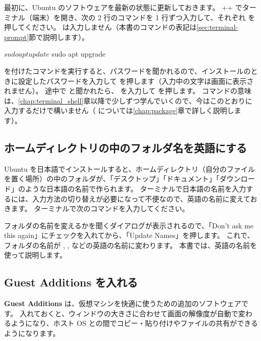 最初に、Ubuntu のソフトウェアを最新の状態に更新しておきます。
++ でターミナル（端末）を開き、次の 2 行のコマンドを 1 行ずつ入力して、それぞれ  を押してください。
\cmd{\$} は入力しません（本書のコマンドの表記は\ref{sec:terminal-prompt}節で説明します）。

\begin{terminal}[インストール後にソフトウェアを更新する]
$ sudo apt update
$ sudo apt upgrade
\end{terminal}

 を付けたコマンドを実行すると、パスワードを聞かれるので、インストールのときに設定したパスワードを入力して  を押します（入力中の文字は画面に表示されません）。
途中で  と聞かれたら、 を入力して  を押します。
コマンドの意味は、\ref{chap:terminal_shell}章以降で少しずつ学んでいくので、今はこのとおりに入力するだけで構いません（ については\ref{chap:package}章で詳しく説明します）。

\subsection{ホームディレクトリの中のフォルダ名を英語にする}

Ubuntu を日本語でインストールすると、ホームディレクトリ（自分のファイルを置く場所）の中のフォルダが、「デスクトップ」「ドキュメント」「ダウンロード」のような日本語の名前で作られます。
ターミナルで日本語の名前を入力するには、入力方法の切り替えが必要になって不便なので、英語の名前に変えておきます。
ターミナルで次のコマンドを入力してください。


フォルダの名前を変えるかを聞くダイアログが表示されるので、「Don't ask me this again」にチェックを入れてから、「Update Names」を押します。
これで、フォルダの名前が , ,  などの英語の名前に変わります。
本書では、英語の名前を使って説明します。

\subsection{Guest Additions を入れる}

\textbf{Guest Additions} は、仮想マシンを快適に使うための追加のソフトウェアです。
入れておくと、ウィンドウの大きさに合わせて画面の解像度が自動で変わるようになり、ホスト OS との間でコピー・貼り付けやファイルの共有ができるようになります。

